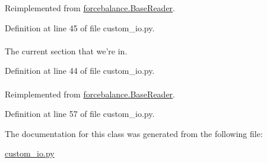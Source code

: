 \-Reimplemented from \hyperlink{classforcebalance_1_1BaseReader_aaf18c900d6055ed4b5124f6bb26164c1}{forcebalance.\-Base\-Reader}.



\-Definition at line 45 of file custom\-\_\-io.\-py.

\hypertarget{classforcebalance_1_1custom__io_1_1Gen__Reader_a98d0b838a59e11f3c733139fc142a0bc}{
\paragraph[{sec}]{}}\label{classforcebalance_1_1custom__io_1_1Gen__Reader_a98d0b838a59e11f3c733139fc142a0bc}


\-The current section that we're in. 



\-Definition at line 44 of file custom\-\_\-io.\-py.

\hypertarget{classforcebalance_1_1custom__io_1_1Gen__Reader_a408f5717e02bcc0d87b8e60bd8b0714e}{
\paragraph[{suffix}]{}}\label{classforcebalance_1_1custom__io_1_1Gen__Reader_a408f5717e02bcc0d87b8e60bd8b0714e}


\-Reimplemented from \hyperlink{classforcebalance_1_1BaseReader_a48ef0584a1b6b4b6f8eb741ad8465db8}{forcebalance.\-Base\-Reader}.



\-Definition at line 57 of file custom\-\_\-io.\-py.



\-The documentation for this class was generated from the following file\-:\begin{DoxyCompactItemize}
\item 
\hyperlink{custom__io_8py}{custom\-\_\-io.\-py}\end{DoxyCompactItemize}
